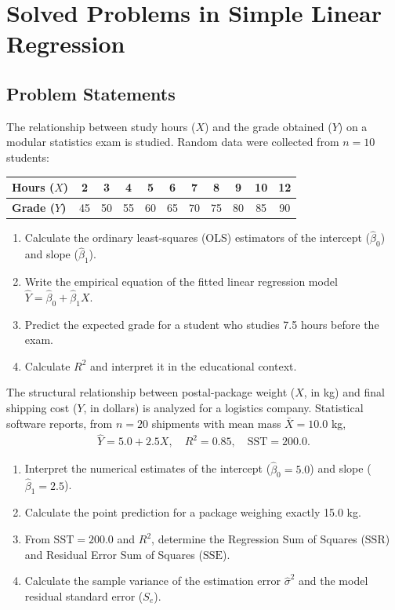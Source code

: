 \section{Solved Problems in Simple Linear Regression}

\subsection*{Problem Statements}

\begin{problema}
\label{prob:ab5bf4a}
The relationship between study hours ($X$) and the grade obtained ($Y$) on a modular statistics exam is studied. Random data were collected from $n=10$ students:
\begin{center}
\begin{tabular}{|l|c|c|c|c|c|c|c|c|c|c|}\hline
\textbf{Hours ($X$)} & 2 & 3 & 4 & 5 & 6 & 7 & 8 & 9 & 10 & 12 \\ \hline
\textbf{Grade ($Y$)} & 45 & 50 & 55 & 60 & 65 & 70 & 75 & 80 & 85 & 90 \\ \hline
\end{tabular}
\end{center}
\begin{enumerate}
\item Calculate the ordinary least-squares (OLS) estimators of the intercept ($\hat{\beta}_0$) and slope ($\hat{\beta}_1$).
\item Write the empirical equation of the fitted linear regression model $\hat Y=\hat\beta_0+\hat\beta_1X$.
\item Predict the expected grade for a student who studies 7.5 hours before the exam.
\item Calculate $R^2$ and interpret it in the educational context.
\end{enumerate}
\end{problema}

\begin{problema}
\label{prob:e5cf043}
The structural relationship between postal-package weight ($X$, in kg) and final shipping cost ($Y$, in dollars) is analyzed for a logistics company. Statistical software reports, from $n=20$ shipments with mean mass $\bar X=10.0$ kg,
\begin{align}
\hat Y=5.0+2.5X,\quad R^2=0.85,\quad \text{SST}=200.0.
\end{align}
\begin{enumerate}
\item Interpret the numerical estimates of the intercept ($\hat\beta_0=5.0$) and slope ($\hat\beta_1=2.5$).
\item Calculate the point prediction for a package weighing exactly 15.0 kg.
\item From $\text{SST}=200.0$ and $R^2$, determine the Regression Sum of Squares ($\text{SSR}$) and Residual Error Sum of Squares ($\text{SSE}$).
\item Calculate the sample variance of the estimation error $\hat\sigma^2$ and the model residual standard error ($S_e$).
\end{enumerate}
\end{problema}

